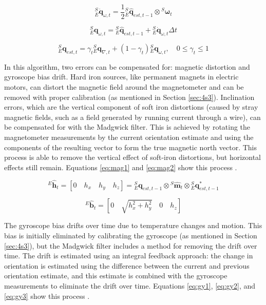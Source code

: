 \documentclass[11pt]{ucthesisCP}
\begin{document}
\begin{equation} \label{eq:gyr}
{}^S_E\dot{\mathbf{q}}_{\omega,t} = \frac{1}{2} 	{}^S_E\hat{\mathbf{q}}_{est,t-1} \otimes {}^S\boldsymbol{\omega}_t
\end{equation}

\begin{equation} \label{eq:gyr2}
{}^S_E\mathbf{q}_{\omega,t} = {}^S_E\hat{\mathbf{q}}_{est,t-1} + {}^S_E\dot{\mathbf{q}}_{\omega,t} \Delta t
\end{equation}

\begin{equation} \label{eq:comb}
{}^S_E\mathbf{q}_{est,t} = \gamma_t {}^S_E\mathbf{q}_{\nabla,t} + (1 - \gamma_t) 	{}^S_E\mathbf{q}_{\omega,t}, \quad 0 \leq \gamma_t \leq 1
\end{equation}

In this algorithm, two errors can be compensated for: magnetic distortion and gyroscope bias drift. Hard iron sources, like permanent magnets in electric motors, can distort the magnetic field around the magnetometer and can be removed with proper calibration (as mentioned in Section \ref{sec:4s3}). Inclination errors, which are the vertical component of soft iron distortions (caused by stray magnetic fields, such as a field generated by running current through a wire), can be compensated for with the Madgwick filter. This is achieved by rotating the magnetometer measurements by the current orientation estimate and using the components of the resulting vector to form the true magnetic north vector. This process is able to remove the vertical effect of soft-iron distortions, but horizontal effects still remain. Equations \ref{eq:mag1} and \ref{eq:mag2} show this process \cite{madgwick}.

\begin{equation} \label{eq:mag1}
^E\hat{\mathbf{h}}_t = \left[0 \quad h_x \quad h_y \quad h_z\right] = {}^S_E\mathbf{q}_{est,t-1} \otimes {}^S\hat{\mathbf{m}}_t \otimes {}^S_E\mathbf{q}_{est,t-1}^*
\end{equation}

\begin{equation} \label{eq:mag2}
^E\hat{\mathbf{b}}_t = \left[0 \quad \sqrt{h_x^2 + h_y^2} \quad 0 \quad h_z\right]
\end{equation}

The gyroscope bias drifts over time due to temperature changes and motion. This bias is initially eliminated by calibrating the gyroscope (as mentioned in Section \ref{sec:4s3}), but the Madgwick filter includes a method for removing the drift over time. The drift is estimated using an integral feedback approach: the change in orientation is estimated using the difference between the current and previous orientation estimate, and this estimate is combined with the gyroscope measurements to eliminate the drift over time. Equations \ref{eq:gy1}, \ref{eq:gy2}, and \ref{eq:gy3} show this process \cite{madgwick}.
\end{document}
